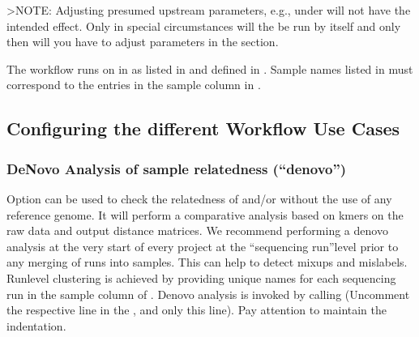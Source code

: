 \documentclass[letterpaper,10pt,english]{sphinxhowto}
\begin{document}
\textgreater{}NOTE: Adjusting presumed upstream parameters, e.g., under  will not have the intended effect. Only in special circumstances will the  be run by itself and only then will you have to adjust parameters in the  section.

The workflow runs on  in  as listed in  and defined in . Sample names listed in  must correspond to the entries in the sample column in .


\subsection{Configuring the different Workflow Use Cases}
\label{\detokenize{index:configuring-the-different-workflow-use-cases}}

\subsubsection{De\sphinxhyphen{}Novo Analysis of sample relatedness (“denovo”)}
\label{\detokenize{index:id6}}
Option  can be used to check the relatedness of  and/or  without the use of any reference genome. It will perform a comparative analysis based on k\sphinxhyphen{}mers on the raw data and output distance matrices. We recommend performing a de\sphinxhyphen{}novo analysis at the very start of every project at the “sequencing run”\sphinxhyphen{}level prior to any merging of runs into samples. This can help to detect mix\sphinxhyphen{}ups and mislabels. Run\sphinxhyphen{}level clustering is achieved by providing unique names for each sequencing run in the sample column of . De\sphinxhyphen{}novo analysis is invoked by calling  (Uncomment the respective line in the , and only this line). Pay attention to maintain the indentation.

\begin{sphinxVerbatim}[commandchars=\\\{\}]
 
\end{sphinxVerbatim}
\end{document}
